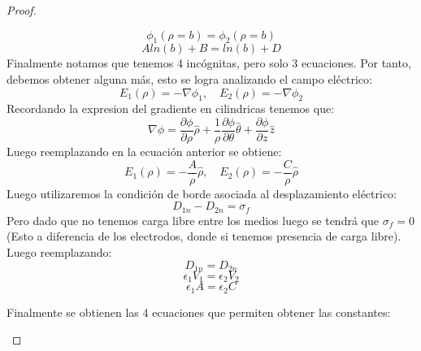\begin{proof}
\begin{enumerate}
        \begin{equation}
            \phi_{1}(\rho=b) = \phi_{2}(\rho=b)
        \end{equation}
        \begin{equation}
            Aln(b) + B = ln(b) + D 
        \end{equation}
        Finalmente notamos que tenemos 4 incógnitas, pero solo 3 ecuaciones. Por tanto, debemos obtener alguna más, esto se logra analizando el campo eléctrico:
        \begin{equation}
            E_{1}(\rho) = -\nabla\phi_{1}, \quad E_{2}(\rho) = -\nabla\phi_{2}
        \end{equation}
        Recordando la expresion del gradiente en cilindricas tenemos que:
        \begin{equation}
            \nabla\phi = \frac{\partial \phi}{\partial \rho} \hat{\rho} + \frac{1}{\rho}\frac{\partial \phi}{\partial \theta} \hat{\theta} + \frac{\partial \phi}{\partial z} \hat{z}
        \end{equation}
        Luego reemplazando en la ecuación anterior se obtiene:
        \begin{equation}
            E_{1}(\rho) =-\frac{A}{\rho} \hat{\rho}, \quad E_{2}(\rho) = -\frac{C}{\rho} \hat{\rho}
        \end{equation}
        Luego utilizaremos la condición de borde asociada al desplazamiento eléctrico:
        \begin{equation}
            D_{1n} - D_{2n} = \sigma_{f}
        \end{equation}
        Pero dado que no tenemos carga libre entre los medios luego se tendrá que $\sigma_{f}= 0$ (Esto a diferencia de los electrodos, donde si tenemos presencia de carga libre). Luego reemplazando:
        \begin{equation}
             D_{1n} = D_{2n}
        \end{equation}
        \begin{equation}
             \epsilon_{1}V_{1} = \epsilon_{2}V_{2}
        \end{equation}
        \begin{equation}
             \epsilon_{1}A = \epsilon_{2}C
        \end{equation}
        
        Finalmente se obtienen las 4 ecuaciones que permiten obtener las constantes:
        

\end{enumerate}
\end{proof}
